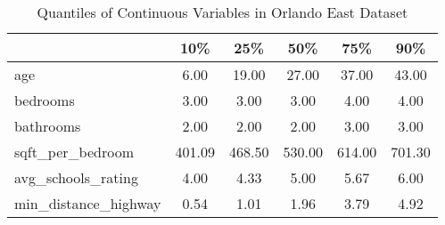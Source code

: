 \begin{table}
\caption{Quantiles of Continuous Variables in Orlando East Dataset}
\label{tab:quantiles_orlando_e}
\begin{tabular}{lccccc}
\toprule
 & 10\% & 25\% & 50\% & 75\% & 90\% \\
\midrule
age & 6.00 & 19.00 & 27.00 & 37.00 & 43.00 \\
bedrooms & 3.00 & 3.00 & 3.00 & 4.00 & 4.00 \\
bathrooms & 2.00 & 2.00 & 2.00 & 3.00 & 3.00 \\
sqft\_per\_bedroom & 401.09 & 468.50 & 530.00 & 614.00 & 701.30 \\
avg\_schools\_rating & 4.00 & 4.33 & 5.00 & 5.67 & 6.00 \\
min\_distance\_highway & 0.54 & 1.01 & 1.96 & 3.79 & 4.92 \\
\bottomrule
\end{tabular}
\end{table}
